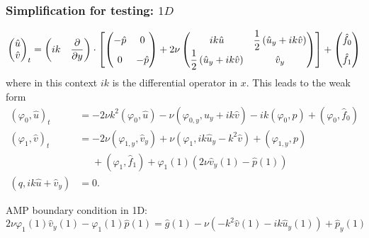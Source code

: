 \documentclass[8pt]{beamer}
\begin{document}
\begin{frame}
    \frametitle{Simplification for testing: \(1D\)}
    \begin{align}
        \begin{pmatrix}
            \hat{u} \\ \hat{v}
        \end{pmatrix}_t
        =
        \begin{pmatrix}
            i k & \dfrac{\partial}{\partial y}
        \end{pmatrix}
        \cdot
        \left[
        \begin{pmatrix}
            -\hat{p} \vphantom{\dfrac{1}{2}} & 0                              \\
            0 \vphantom{\dfrac{1}{2}}        & -\hat{p}
        \end{pmatrix}
        +
        2 \nu
        \begin{pmatrix}
            i k \hat{u} & \dfrac{1}{2} \left(\hat{u}_y + i k \hat{v}\right)   \\
            \dfrac{1}{2} \left(\hat{u}_y + i k \hat{v}\right) & \hat{v}_y
        \end{pmatrix}
        \right]
        +
        \begin{pmatrix}
            \hat{f}_0 \vphantom{\dfrac{1}{2}}                                 \\
            \hat{f}_1 \vphantom{\dfrac{1}{2}}
        \end{pmatrix}
    \end{align}
    where in this context \(i k\) is the differential operator in \(x\). This
    leads to the weak form
    \begin{align}
        (\varphi_0, \hat{u})_t
        &=
        -2 \nu k^2 (\varphi_0, \hat{u})
        - \nu (\varphi_{0,y}, \hat{u}_y + i k \hat{v})
        - i k (\varphi_0, p)
        + (\varphi_0, \hat{f}_0)                                              \\
        (\varphi_1, \hat{v})_t
        &=
        -2 \nu (\varphi_{1,y}, \hat{v}_y)
        + \nu (\varphi_1, i k \hat{u}_y - k^2 \hat{v})
        + (\varphi_{1,y}, p)                                                  \\
        &\phantom{=} + (\varphi_1, \hat{f}_1)
        + \varphi_1(1) (2 \nu \hat{v}_y(1) - \hat{p}(1))
        \nonumber                                                             \\
        (q, i k \hat{u} + \hat{v}_y)
        &= 0.
    \end{align}

    \pause
    AMP boundary condition in 1D:
    \begin{equation}
        2 \nu \varphi_1(1) \hat{v}_y(1) - \varphi_1(1) \hat{p}(1)
        = \hat{g}(1) - \nu (-k^2 \hat{v}(1) - i k \hat{u}_y(1)) + \hat{p}_y(1)
    \end{equation}
\end{frame}
\end{document}
